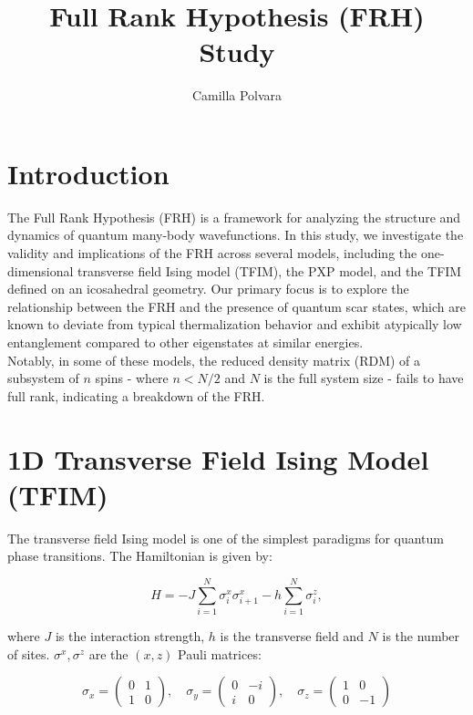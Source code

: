 \documentclass{article}
\title{Full Rank Hypothesis (FRH) Study}
\author{Camilla Polvara}
\date{}
\begin{document}
\maketitle

\section{Introduction}
The Full Rank Hypothesis (FRH) is a framework for analyzing the structure and dynamics of quantum many-body wavefunctions. In this study, we investigate the validity and implications of the FRH across several models, including the one-dimensional transverse field Ising model (TFIM), the PXP model, and the TFIM defined on an icosahedral geometry. Our primary focus is to explore the relationship between the FRH and the presence of quantum scar states, which are known to deviate from typical thermalization behavior and exhibit atypically low entanglement compared to other eigenstates at similar energies.\\
Notably, in some of these models, the reduced density matrix (RDM) of a subsystem of \( n \) spins - where \( n < N/2 \) and \( N \) is the full system size - fails to have full rank, indicating a breakdown of the FRH.


\section{1D Transverse Field Ising Model (TFIM)}
The transverse field Ising model is one of the simplest paradigms for quantum phase transitions. The Hamiltonian is given by:

\begin{equation} \label{e1}
    H = -J \sum_{i=1}^N \sigma^x_i \sigma^x_{i+1} - h \sum_{i=1}^N \sigma^z_i,
\end{equation}

where $J$ is the interaction strength, $h$ is the transverse field and $N$ is the number of sites. $\sigma^x, \sigma^z$ are the $(x,z)$ Pauli matrices:

\begin{equation}
\sigma_x = \begin{pmatrix} 0 & 1 \\ 1 & 0 \end{pmatrix}, \quad
\sigma_y = \begin{pmatrix} 0 & -i \\ i & 0 \end{pmatrix}, \quad
\sigma_z = \begin{pmatrix} 1 & 0 \\ 0 & -1 \end{pmatrix}
\end{equation}
\end{document}
